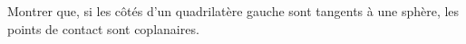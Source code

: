Montrer que, si les côtés d'un quadrilatère gauche sont tangents à une sphère, les points de contact sont coplanaires.
